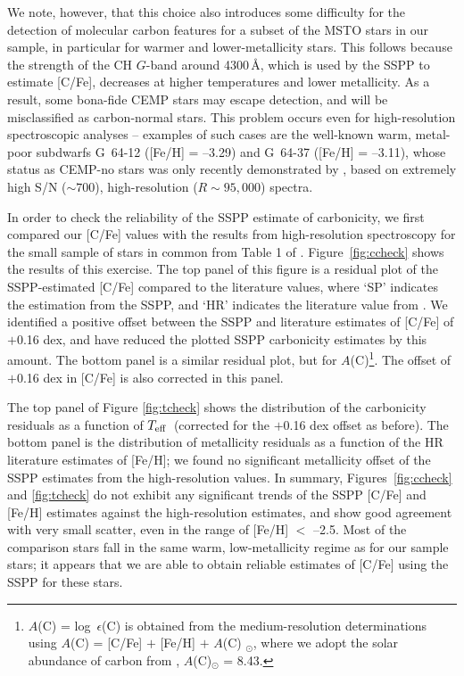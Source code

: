 \documentclass[iop]{emulateapj}
\newcommand*{\ac}{$A$(C)}
\newcommand*{\teff}{$T_{\rm eff}$}
\begin{document}
We note, however, that this choice also introduces some difficulty for
the detection of molecular carbon features for a subset of the MSTO
stars in our sample, in particular for warmer and lower-metallicity
stars. This follows because the strength of the CH $G$-band around
4300\,{\AA}, which is used by the SSPP to estimate [C/Fe], decreases at
higher temperatures and lower metallicity. As a result, some bona-fide
CEMP stars may escape detection, and will be misclassified
as carbon-normal stars. This problem occurs even for high-resolution
spectroscopic analyses -- examples of such cases are the well-known
warm, metal-poor subdwarfs G~64-12 ([Fe/H] = --3.29) and G~64-37 ([Fe/H]
= --3.11), whose status as CEMP-no stars was only recently demonstrated
by \citet{placco2016}, based on extremely high S/N ($\sim700$),
high-resolution ($R\sim95,000$) spectra.

In order to check the reliability of the SSPP estimate of carbonicity,
we first compared our [C/Fe] values with the results from high-resolution
spectroscopy for the small sample of stars in common from Table 1 of
\citet{yoon2016}. Figure~\ref{fig:ccheck} shows the results of this
exercise. The top panel of this figure is a residual plot of the
SSPP-estimated [C/Fe] compared to the literature values, where
`SP' indicates the estimation from the SSPP, and `HR'
indicates the literature value from \citet{yoon2016}. We identified a positive
offset between the SSPP and literature estimates of [C/Fe] of $+$0.16 dex, and have
reduced the plotted SSPP carbonicity estimates by this amount. The bottom panel
is a similar residual plot, but for \ac\footnote[10]{$A$(C) = log\,
$\epsilon$(C) is obtained from the medium-resolution determinations
using $A$(C) = [C/Fe] $+$ [Fe/H] $+$ $A$(C) $_{\odot}$, where we adopt the
solar abundance of carbon from \citet{asplund2009}, $A$(C)$_{\odot}$ =
8.43.}. The offset of $+$0.16 dex in [C/Fe] is also corrected in this
panel.

The top panel of Figure \ref{fig:tcheck} shows the distribution of the
carbonicity residuals as a function of \teff\ (corrected for the $+$0.16 dex
offset as before). The bottom panel is the distribution of metallicity residuals as
a function of the HR literature estimates of [Fe/H];  we found no significant
metallicity offset of the SSPP estimates from the high-resolution
values. In summary, Figures~\ref{fig:ccheck} and \ref{fig:tcheck} do not exhibit
any significant trends of the SSPP [C/Fe] and [Fe/H] estimates against
the high-resolution estimates, and show good agreement with very small
scatter, even in the range of [Fe/H] $<$ --2.5. Most of the comparison
stars fall in the same warm, low-metallicity regime as for our sample
stars; it appears that we are able to obtain reliable estimates of
[C/Fe] using the SSPP for these stars.
\end{document}
